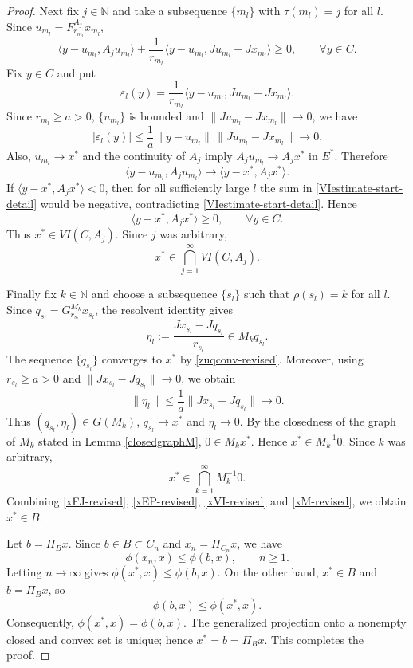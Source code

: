 \documentclass[10pt,a4paper]{amsart}
\numberwithin{equation}{section}
\begin{document}
\begin{proof}
Next fix $j\in\mathbb N$ and take a subsequence $\{m_l\}$ with $\tau(m_l)=j$ for all $l$. Since $u_{m_l}=F_{r_{m_l}}^{A_j}x_{m_l}$,
\begin{equation}\label{VIestimate-start-detail}
\langle y-u_{m_l},A_ju_{m_l}\rangle+
\frac{1}{r_{m_l}}\langle y-u_{m_l},Ju_{m_l}-Jx_{m_l}\rangle\geq0,
\qquad \forall y\in C.
\end{equation}
Fix $y\in C$ and put
\[
\varepsilon_l(y)=\frac{1}{r_{m_l}}\langle y-u_{m_l},Ju_{m_l}-Jx_{m_l}\rangle.
\]
Since $r_{m_l}\geq a>0$, $\{u_{m_l}\}$ is bounded and $\|Ju_{m_l}-Jx_{m_l}\|\to0$, we have
\[
|\varepsilon_l(y)|\leq \frac{1}{a}\|y-u_{m_l}\|\,\|Ju_{m_l}-Jx_{m_l}\|\to0.
\]
Also, $u_{m_l}\to x^{*}$ and the continuity of $A_j$ imply $A_ju_{m_l}\to A_jx^{*}$ in $E^{*}$. Therefore
\[
\langle y-u_{m_l},A_ju_{m_l}\rangle\to \langle y-x^{*},A_jx^{*}\rangle.
\]
If $\langle y-x^{*},A_jx^{*}\rangle<0$, then for all sufficiently large $l$ the sum in \eqref{VIestimate-start-detail} would be negative, contradicting \eqref{VIestimate-start-detail}. Hence
\[
\langle y-x^{*},A_jx^{*}\rangle\geq0,
\qquad \forall y\in C.
\]
Thus $x^{*}\in VI(C,A_j)$. Since $j$ was arbitrary,
\begin{equation}\label{xVI-revised}
x^{*}\in\bigcap_{j=1}^{\infty}VI(C,A_j).
\end{equation}

Finally fix $k\in\mathbb N$ and choose a subsequence $\{s_l\}$ such that $\rho(s_l)=k$ for all $l$. Since $q_{s_l}=G_{r_{s_l}}^{M_k}x_{s_l}$, the resolvent identity gives
\[
\eta_l:=\frac{Jx_{s_l}-Jq_{s_l}}{r_{s_l}}\in M_kq_{s_l}.
\]
The sequence $\{q_{s_l}\}$ converges to $x^{*}$ by \eqref{zuqconv-revised}. Moreover, using $r_{s_l}\geq a>0$ and $\|Jx_{s_l}-Jq_{s_l}\|\to0$, we obtain
\[
\|\eta_l\|\leq \frac{1}{a}\|Jx_{s_l}-Jq_{s_l}\|\to0.
\]
Thus $(q_{s_l},\eta_l)\in G(M_k)$, $q_{s_l}\to x^{*}$ and $\eta_l\to0$. By the closedness of the graph of $M_k$ stated in Lemma \ref{closedgraphM}, $0\in M_kx^{*}$. Hence $x^{*}\in M_k^{-1}0$. Since $k$ was arbitrary,
\begin{equation}\label{xM-revised}
x^{*}\in\bigcap_{k=1}^{\infty}M_k^{-1}0.
\end{equation}
Combining \eqref{xFJ-revised}, \eqref{xEP-revised}, \eqref{xVI-revised} and \eqref{xM-revised}, we obtain $x^{*}\in B$.

Let $b=\Pi_Bx$. Since $b\in B\subset C_n$ and $x_n=\Pi_{C_n}x$, we have
\[
\phi(x_n,x)\leq \phi(b,x),\qquad n\geq1.
\]
Letting $n\to\infty$ gives $\phi(x^{*},x)\leq\phi(b,x)$. On the other hand, $x^{*}\in B$ and $b=\Pi_Bx$, so
\[
\phi(b,x)\leq \phi(x^{*},x).
\]
Consequently, $\phi(x^{*},x)=\phi(b,x)$. The generalized projection onto a nonempty closed and convex set is unique; hence $x^{*}=b=\Pi_Bx$. This completes the proof.
\end{proof}
\end{document}
